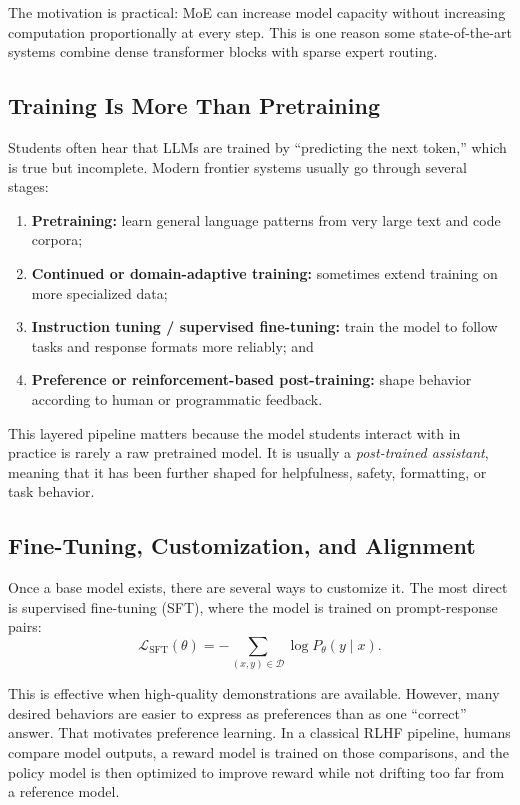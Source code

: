 \documentclass[12pt]{article}
\begin{document}
The motivation is practical: MoE can increase model capacity without increasing computation proportionally at every step. This is one reason some state-of-the-art systems combine dense transformer blocks with sparse expert routing.

\subsection{Training Is More Than Pretraining}

Students often hear that LLMs are trained by ``predicting the next token,'' which is true but incomplete. Modern frontier systems usually go through several stages:
\begin{enumerate}
    \item \textbf{Pretraining:} learn general language patterns from very large text and code corpora;
    \item \textbf{Continued or domain-adaptive training:} sometimes extend training on more specialized data;
    \item \textbf{Instruction tuning / supervised fine-tuning:} train the model to follow tasks and response formats more reliably; and
    \item \textbf{Preference or reinforcement-based post-training:} shape behavior according to human or programmatic feedback.
\end{enumerate}

This layered pipeline matters because the model students interact with in practice is rarely a raw pretrained model. It is usually a \emph{post-trained assistant}, meaning that it has been further shaped for helpfulness, safety, formatting, or task behavior.

\subsection{Fine-Tuning, Customization, and Alignment}

Once a base model exists, there are several ways to customize it. The most direct is supervised fine-tuning (SFT), where the model is trained on prompt-response pairs:
\begin{equation}
    \mathcal{L}_{\mathrm{SFT}}(\theta)
    = -\sum_{(x,y)\in\mathcal{D}} \log P_\theta(y\mid x).
    \label{t15eq:sft}
\end{equation}

This is effective when high-quality demonstrations are available. However, many desired behaviors are easier to express as preferences than as one ``correct'' answer. That motivates preference learning. In a classical RLHF pipeline, humans compare model outputs, a reward model is trained on those comparisons, and the policy model is then optimized to improve reward while not drifting too far from a reference model.
\end{document}
